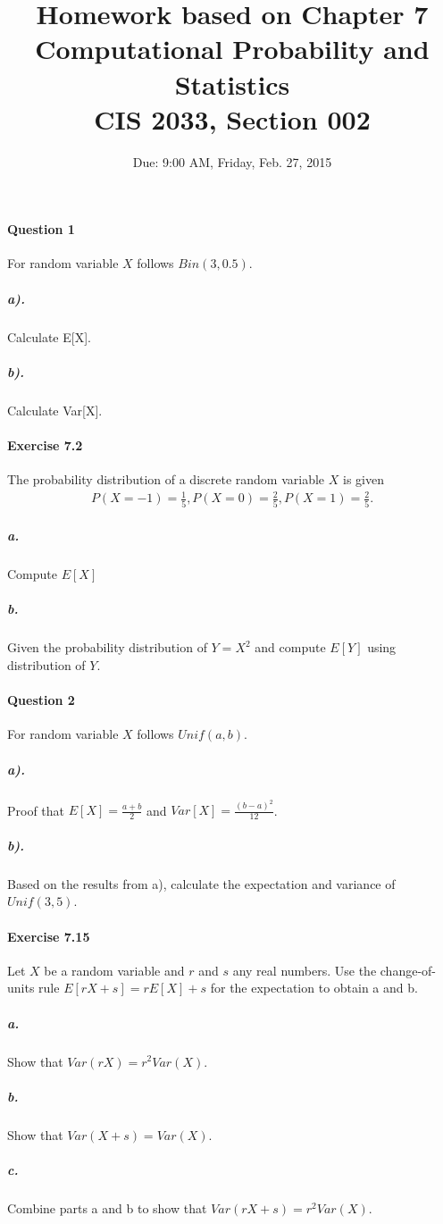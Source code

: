 \documentclass[11pt]{article} %
\title{Homework based on Chapter 7\\
Computational Probability and Statistics \\
CIS 2033, Section 002}
\author{Due: 9:00 AM, Friday, Feb. 27, 2015}
\date{} %
\begin{document}
\maketitle

\paragraph*{Question 1} For random variable $X$ follows $Bin(3, 0.5)$. 
\subparagraph*{a).} Calculate E[X].
\subparagraph*{b).} Calculate Var[X].

\paragraph*{Exercise 7.2} The probability distribution of a discrete random variable $X$ is given 
\begin{align*}
P(X = -1) = \frac{1}{5}, P(X= 0) = \frac{2}{5}, P(X = 1) = \frac{2}{5}.
\end{align*}

\subparagraph*{a.} Compute $E[X]$
\subparagraph*{b.} Given the probability distribution of $Y=X^2$ and compute $E[Y]$ using distribution of $Y$. 

\paragraph*{Question 2} For random variable $X$ follows $Unif(a, b)$.
\subparagraph*{a).} Proof that $E[X] = \frac{a+b}{2}$ and $Var[X] = \frac{(b-a)^2}{12}$.
\subparagraph*{b).} Based on the results from a), calculate the expectation and variance of $Unif(3, 5)$.


\paragraph*{Exercise 7.15} Let $X$ be a random variable and $r$ and $s$ any real numbers. Use the change-of-units rule $E[rX + s] = rE[X ] + s$ for the expectation to obtain a and b.
\subparagraph*{a.} Show that $Var(rX) = r^2Var(X)$.
\subparagraph*{b.} Show that $Var(X + s) = Var(X)$.
\subparagraph*{c.} Combine parts a and b to show that $Var( r X + s ) = r^2 Var(X)$.
\end{document}
